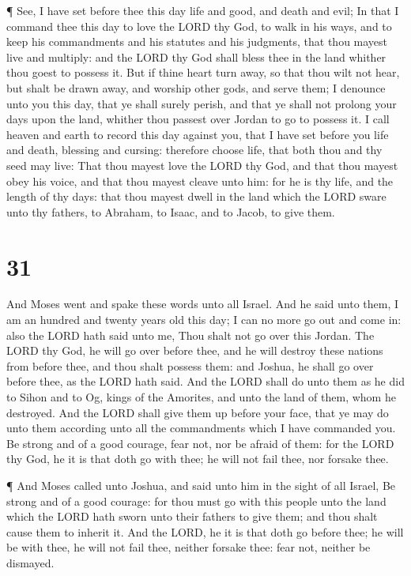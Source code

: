  ¶ See, I have set before thee this day life and good, and
death and evil;  In that I command thee this day to love
the LORD thy God, to walk in his ways, and to keep his commandments and
his statutes and his judgments, that thou mayest live and multiply: and
the LORD thy God shall bless thee in the land whither thou goest to
possess it.  But if thine heart turn away, so that thou
wilt not hear, but shalt be drawn away, and worship other gods, and
serve them;  I denounce unto you this day, that ye shall
surely perish, and that ye shall not prolong your days upon the land,
whither thou passest over Jordan to go to possess it.  I
call heaven and earth to record this day against you, that I have set
before you life and death, blessing and cursing: therefore choose life,
that both thou and thy seed may live:  That thou mayest
love the LORD thy God, and that thou mayest obey his voice, and that
thou mayest cleave unto him: for he is thy life, and the length of thy
days: that thou mayest dwell in the land which the LORD sware unto thy
fathers, to Abraham, to Isaac, and to Jacob, to give them.

\hypertarget{section-30}{%
\section{31}\label{section-30}}

 And Moses went and spake these words unto all Israel.
 And he said unto them, I am an hundred and twenty years old
this day; I can no more go out and come in: also the LORD hath said unto
me, Thou shalt not go over this Jordan.  The LORD thy God,
he will go over before thee, and he will destroy these nations from
before thee, and thou shalt possess them: and Joshua, he shall go over
before thee, as the LORD hath said.  And the LORD shall do
unto them as he did to Sihon and to Og, kings of the Amorites, and unto
the land of them, whom he destroyed.  And the LORD shall
give them up before your face, that ye may do unto them according unto
all the commandments which I have commanded you.  Be strong
and of a good courage, fear not, nor be afraid of them: for the LORD thy
God, he it is that doth go with thee; he will not fail thee, nor forsake
thee.

 ¶ And Moses called unto Joshua, and said unto him in the
sight of all Israel, Be strong and of a good courage: for thou must go
with this people unto the land which the LORD hath sworn unto their
fathers to give them; and thou shalt cause them to inherit it.
 And the LORD, he it is that doth go before thee; he will be
with thee, he will not fail thee, neither forsake thee: fear not,
neither be dismayed.

